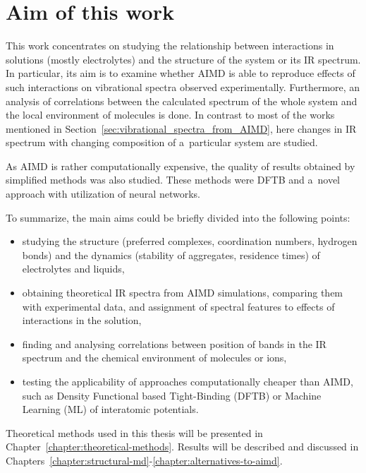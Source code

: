 \section{Aim of this work}

This work concentrates on studying the relationship between interactions in solutions (mostly electrolytes) and the structure of the system or its IR spectrum. In particular, its aim is to examine whether AIMD is able to reproduce effects of such interactions on vibrational spectra observed experimentally. Furthermore, an analysis of correlations between the calculated spectrum of the whole system and the local environment of molecules is done. In contrast to most of the works mentioned in Section~\ref{sec:vibrational_spectra_from_AIMD}, here changes in IR spectrum with changing composition of a~particular system are studied.

As AIMD is rather computationally expensive, the quality of results obtained by simplified methods was also studied. These methods were DFTB and a~novel approach with utilization of neural networks.

To summarize, the main aims could be briefly divided into the following points:
\begin{itemize}
    \item studying the structure (preferred complexes, coordination numbers, hydrogen bonds) and the dynamics (stability of aggregates, residence times) of electrolytes and liquids,
    \item obtaining theoretical IR spectra from AIMD simulations, comparing them with experimental data, and assignment of spectral features to effects of interactions in the solution,
    \item finding and analysing correlations between position of bands in the IR spectrum and the chemical environment of molecules or ions,
    \item testing the applicability of approaches computationally cheaper than AIMD, such as Density Functional based Tight-Binding (DFTB) or Machine Learning (ML) of interatomic potentials.
\end{itemize}

Theoretical methods used in this thesis will be presented in Chapter~\ref{chapter:theoretical-methods}. Results will be described and discussed in Chapters~\ref{chapter:structural-md}-\ref{chapter:alternatives-to-aimd}.